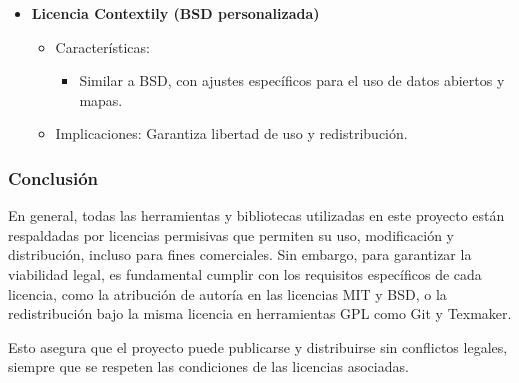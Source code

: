\begin{itemize}
    \item \textbf{Licencia Contextily (BSD personalizada)}  
        \begin{itemize}
            \item Características:
                \begin{itemize}
                    \item Similar a BSD, con ajustes específicos para el uso de datos abiertos y mapas.
                \end{itemize}
            \item Implicaciones: Garantiza libertad de uso y redistribución.
        \end{itemize}
\end{itemize}

\subsubsection{Conclusión}

En general, todas las herramientas y bibliotecas utilizadas en este proyecto están respaldadas por licencias permisivas que permiten su uso, modificación y distribución, incluso para fines comerciales. Sin embargo, para garantizar la viabilidad legal, es fundamental cumplir con los requisitos específicos de cada licencia, como la atribución de autoría en las licencias MIT y BSD, o la redistribución bajo la misma licencia en herramientas GPL como Git y Texmaker.

Esto asegura que el proyecto puede publicarse y distribuirse sin conflictos legales, siempre que se respeten las condiciones de las licencias asociadas.

